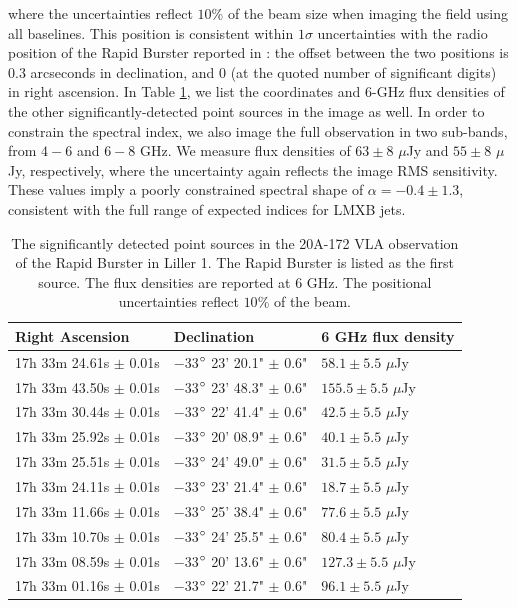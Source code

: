 \documentclass[fleqn,usenatbib]{mnras}
\begin{document}
\noindent where the uncertainties reflect $10$\% of the beam size when imaging the field using all baselines. This position is consistent within $1\sigma$ uncertainties with the radio position of the Rapid Burster reported in \citet{moore2000}: the offset between the two positions is $0.3$ arcseconds in declination, and $0$ (at the quoted number of significant digits) in right ascension. In Table \ref{tab:coords}, we list the coordinates and 6-GHz flux densities of the other significantly-detected point sources in the image as well. In order to constrain the spectral index, we also image the full observation in two sub-bands, from $4-6$ and $6-8$ GHz. We measure flux densities of $63\pm8$ $\mu$Jy and $55\pm8$ $\mu$Jy, respectively, where the uncertainty again reflects the image RMS sensitivity. These values imply a poorly constrained spectral shape of $\alpha = -0.4 \pm 1.3$, consistent with the full range of expected indices for LMXB jets.

\begin{table}
\begin{centering}
\begin{tabular}{lll}
\hline
Right Ascension & Declination & 6 GHz flux density \\ \hline
17h 33m 24.61s $\pm$ 0.01s &$-$33$\degree$ 23' 20.1" $\pm$ 0.6" & $58.1 \pm 5.5$ $\mu$Jy \\
\hline
17h 33m 43.50s $\pm$ 0.01s &$-$33$\degree$ 23' 48.3" $\pm$ 0.6" & $155.5 \pm 5.5$ $\mu$Jy \\
17h 33m 30.44s $\pm$ 0.01s &$-$33$\degree$ 22' 41.4" $\pm$ 0.6" & $42.5 \pm 5.5$ $\mu$Jy \\
17h 33m 25.92s $\pm$ 0.01s &$-$33$\degree$ 20' 08.9" $\pm$ 0.6" & $40.1 \pm 5.5$ $\mu$Jy \\
17h 33m 25.51s $\pm$ 0.01s &$-$33$\degree$ 24' 49.0" $\pm$ 0.6" & $31.5 \pm 5.5$ $\mu$Jy \\
17h 33m 24.11s $\pm$ 0.01s &$-$33$\degree$ 23' 21.4" $\pm$ 0.6" & $18.7 \pm 5.5$ $\mu$Jy \\
17h 33m 11.66s $\pm$ 0.01s &$-$33$\degree$ 25' 38.4" $\pm$ 0.6" & $77.6 \pm 5.5$ $\mu$Jy \\
17h 33m 10.70s $\pm$ 0.01s &$-$33$\degree$ 24' 25.5" $\pm$ 0.6" & $80.4 \pm 5.5$ $\mu$Jy \\
17h 33m 08.59s $\pm$ 0.01s &$-$33$\degree$ 20' 13.6" $\pm$ 0.6" & $127.3 \pm 5.5$ $\mu$Jy \\
17h 33m 01.16s $\pm$ 0.01s &$-$33$\degree$ 22' 21.7" $\pm$ 0.6" & $96.1 \pm 5.5$ $\mu$Jy \\
\hline
\end{tabular}
\caption{The significantly detected point sources in the 20A-172 VLA observation of the Rapid Burster in Liller 1. The Rapid Burster is listed as the first source. The flux densities are reported at 6 GHz. The positional uncertainties reflect $10\%$ of the beam.}
\label{tab:coords}
\end{centering}
\end{table}
\end{document}
